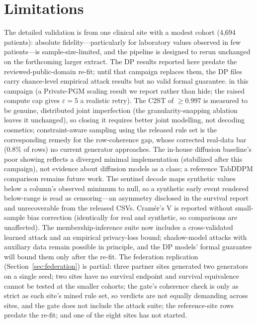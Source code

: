 \documentclass[11pt,a4paper]{article}
\newcommand{\eps}{\ensuremath{\varepsilon}}
\begin{document}
\section{Limitations}

The detailed validation is from one clinical site with a modest cohort
(4{,}694 patients): absolute
fidelity---particularly for laboratory values observed in few patients---is
sample-size-limited, and the pipeline is designed to rerun unchanged on the
forthcoming larger extract. The DP results reported here predate the
reviewed-public-domain re-fit; until that campaign replaces them, the DP
files carry chance-level empirical attack results but no
valid formal guarantee.
in this campaign (a Private-PGM scaling result we report rather than hide; the
raised compute cap gives $\eps = 5$ a realistic retry). The C2ST of
$\geq 0.997$ is measured to be genuine, distributed joint imperfection (the
granularity-snapping ablation leaves it unchanged), so closing it requires better
joint modelling, not decoding cosmetics; constraint-aware sampling using the
released rule set is the corresponding remedy for the row-coherence gap, whose
corrected real-data bar (0.8\% of rows) no current generator approaches. The
in-house diffusion baseline's poor showing reflects a diverged minimal
implementation (stabilized after this campaign), not evidence about diffusion
models as a class; a reference TabDDPM comparison remains future work. The
sentinel decode maps synthetic values below a column's observed minimum to null,
so a synthetic early event rendered below-range is read as censoring---an
asymmetry disclosed in the survival report and unrecoverable from the released
CSVs. Cram\'er's V is reported without small-sample bias correction (identically
for real and synthetic, so comparisons are unaffected). The membership-inference
suite now includes a cross-validated learned attack and an empirical
privacy-loss bound; shadow-model attacks with auxiliary data remain possible in
principle, and the DP models' formal guarantee will bound them only after the
re-fit. The federation replication (Section~\ref{sec:federation}) is partial:
three partner sites generated two generators on a single seed; two sites have no
survival endpoint and survival equivalence cannot be tested at the smaller
cohorts; the gate's coherence check is only as strict as each site's mined rule
set, so verdicts are not equally demanding across sites, and the gate does not
include the attack suite; the reference-site rows predate the re-fit; and one of
the eight sites has not started.
\end{document}
